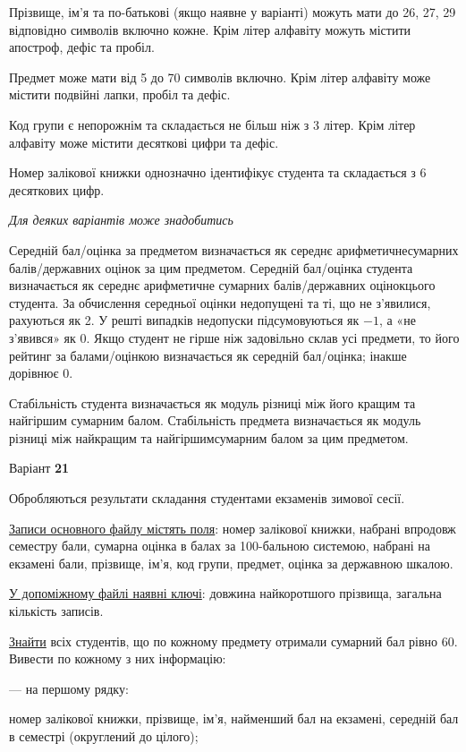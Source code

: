 \documentclass[11pt, ukrainian]{article}
\begin{document}
Прізвище, ім’я та по-батькові (якщо наявне у варіанті) можуть мати до 26, 27, 29 відповідно символів включно кожне. 
Крім літер алфавіту можуть містити апостроф, дефіс та пробіл.

Предмет може мати від 5 до 70 символів включно. 
Крім літер алфавіту може містити подвійні лапки, пробіл та дефіс.

Код групи є непорожнім та складається не більш ніж з 3 літер. 
Крім літер алфавіту може містити десяткові цифри та дефіс.


Номер залікової книжки однозначно ідентифікує студента та складається з 6 десяткових цифр. 

\bigskip\textit{Для деяких варіантів може знадобитись}

Середній бал/оцінка за предметом визначається як середнє арифметичнесумарних балів/державних оцінок за цим предметом. 
Середній бал/оцінка студента визначається як середнє арифметичне сумарних балів/державних оцінокцього студента. 
За обчислення середньої оцінки недопущені та ті, що не з’явилися, рахуються як 2.
У решті випадків недопуски підсумовуються як $-1$, а «не з’явився» як 0.
Якщо студент не гірше ніж задовільно склав усі предмети, 
то його рейтинг за балами/оцінкою визначається як середній бал/оцінка; інакше дорівнює 0.

Стабільність студента визначається як модуль різниці між його кращим та найгіршим сумарним балом.
Стабільність предмета визначається як модуль різниці між найкращим та найгіршимсумарним балом за цим предметом.




\par
\newpage
{\center Варіант  \No \textbf { 21 }\par}
\bigskip
Обробляються результати складання студентами екзаменів зимової сесії.

\underline{Записи основного файлу містять поля}: номер залікової книжки, набрані впродовж семестру бали, сумарна оцінка в балах за 100-бальною системою, набрані на екзамені бали, прізвище, ім’я, код групи, предмет, оцінка за державною шкалою.

\underline{У допоміжному файлі наявні ключі}: довжина найкоротшого прізвища, загальна кількість записів.

\underline{Знайти} всіх студентів, що по кожному предмету отримали сумарний бал рівно 60. Вивести по кожному з них інформацію:\par
{\noindent}--- на першому рядку:\par
номер залікової книжки, прізвище, ім’я, найменший бал на екзамені, середній бал в семестрі (округлений до цілого);
\end{document}
